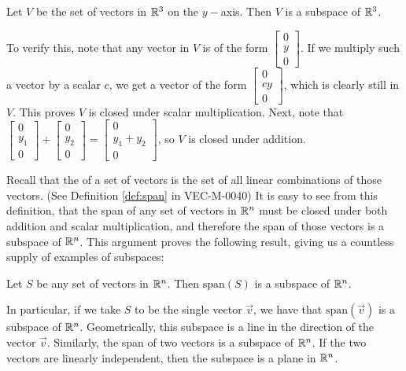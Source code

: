 \documentclass{ximera}
\begin{document}
\begin{example} \label{y-axis_subspace}
Let $V$ be the set of vectors in $\mathbb{R}^3$ on the $y-$axis.  Then $V$ is a subspace of $\mathbb{R}^3$.  

\begin{explanation}
To verify this, note that any vector in $V$ is of the form $\begin{bmatrix}0\\y\\0 \end{bmatrix}$.  If we multiply such a vector by a scalar $c$, we get a vector of the form $\begin{bmatrix}0\\cy\\0 \end{bmatrix}$, which is clearly still in $V$.  This proves $V$ is closed under scalar multiplication.  Next, note that $\begin{bmatrix}0\\y_1\\0 \end{bmatrix} + \begin{bmatrix}0\\y_2\\0 \end{bmatrix}= \begin{bmatrix}0\\y_1 + y_2\\0\end{bmatrix}$, so $V$ is closed under addition.
\end{explanation}
\end{example}

Recall that the  of a set of vectors is the set of all linear combinations of those vectors. (See Definition \ref{def:span} in VEC-M-0040)  It is easy to see from this definition, that the span of any set of vectors in $\mathbb{R}^n$ must be closed under both addition and scalar multiplication, and therefore the span of those vectors is a subspace of $\mathbb{R}^n$.  This argument proves the following result, giving us a countless supply of examples of subspaces:

\begin{theorem} \label{th:span_is_subspace}
Let $S$ be any set of vectors in $\mathbb{R}^n$.  Then $\text{span}(S)$ is a subspace of $\mathbb{R}^n$.
\end{theorem}

In particular, if we take $S$ to be the single vector $\vec{v}$, we have that $\text{span}(\vec{v})$ is a subspace of $\mathbb{R}^n$.  Geometrically, this subspace is a line in the direction of the vector $\vec{v}$.  Similarly, the span of two vectors is a subspace of $\mathbb{R}^n$.  If the two vectors are linearly independent, then the subspace is a plane in $\mathbb{R}^n$. 
\end{document}
